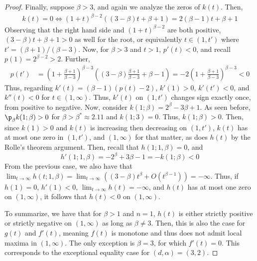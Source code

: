 \documentclass[11pt]{article}
\begin{document}
\begin{proof}
Finally, suppose $\beta>3$, and again we analyze the zeros of $k(t)$. Then, 
\begin{align*}
    k(t)=0\Leftrightarrow (1+t)^{\beta-2}((3-\beta)t+\beta+1)=2(\beta-1)t+\beta+1
\end{align*}
Observing that the right hand side and $(1+t)^{\beta-2}$ are both positive, $(3-\beta)t+\beta+1>0$ as well for the root, or equivalently $t\in (1,t')$ where $t'=(\beta+1)/(\beta-3)$. Now, for $\beta > 3$ and $t>1$, $p'(t)<0$, and recall $p(1)=2^{\beta-2}>2$. Further,
\begin{align*}
    p(t')&=\left(1+\frac{\beta+1}{\beta-3}\right)^{\beta-3}\left((3-\beta)\frac{\beta+1}{\beta-3}+\beta-1\right)=-2 \left(1+\frac{\beta+1}{\beta-3}\right)^{\beta-3}<0
\end{align*}
Thus, regarding $k'(t)=(\beta-1)(p(t)-2)$, $k'(1)>0$, $k'(t')<0$, and $k''(t)<0$ for $t\in (1,\infty)$. Thus, $k'(t)$ on $(1,t')$ changes sign exactly once, from positive to negative. Now, consider $k(1;\beta)=2^{\beta}-3\beta +1$. As seen before, $\p_\beta k(1;\beta)>0$ for $\beta > \beta^*\approx 2.11$ and $k(1;3)=0$. Thus, $k(1;\beta)>0$. Then, since $k(1)>0$ and $k(t)$ is increasing then decreasing on $(1,t')$, $k(t)$ has at most one zero in $(1,t')$, and $(1,\infty)$ for that matter, as does $h(t)$ by the Rolle's theorem argument. Then, recall that $h(1;1,\beta)=0$, and
$$h'(1;1,\beta)=-2^{\beta}+3\beta -1=-k(1;\beta)<0$$
From the previous case, we also have that $\lim_{t\to \infty}h(t;1,\beta)=\lim_{t\to \infty}((3-\beta)t^{\beta}+O(t^{\beta-1}))=-\infty$. Thus, if $h(1)=0$, $h'(1)<0$, $\lim_{t\to \infty}h(t)=-\infty$, and $h(t)$ has at most one zero on $(1,\infty)$, it follows that $h(t)<0$ on $(1,\infty)$.

To summarize, we have that for $\beta > 1$ and $n=1$, $h(t)$ is either strictly positive or strictly negative on $(1,\infty)$ as long as $\beta \neq 3$. Then, this is also the case for $g(t)$ and $f'(t)$, meaning $f(t)$ is monotone and thus does not admit local maxima in $(1,\infty)$. The only exception is $\beta =3$, for which $f'(t)=0$. This corresponds to the exceptional equality case for $(d,\alpha)=(3,2)$.
\end{proof}
\end{document}
